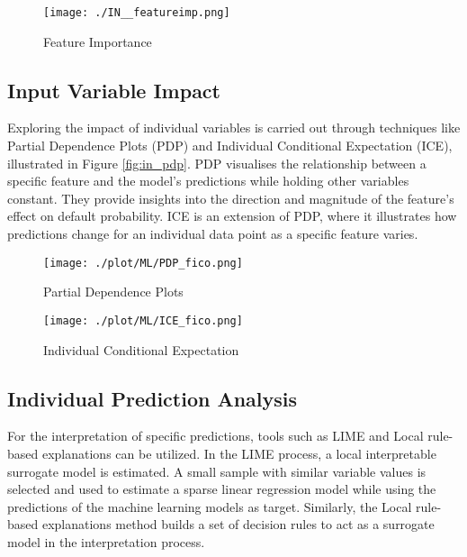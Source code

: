 \begin{figure}[H]
	\centering
	\texttt{[image: ./IN\_\_featureimp.png]}
    \caption{Feature Importance}
    \label{fig:in_featureimp}
\end{figure}

\subsection{Input Variable Impact}
Exploring the impact of individual variables is carried out through techniques like Partial Dependence Plots (PDP) and Individual Conditional Expectation (ICE), illustrated in Figure \ref{fig:in_pdp}. PDP visualises the relationship between a specific feature and the model's predictions while holding other variables constant. They provide insights into the direction and magnitude of the feature's effect on default probability. ICE is an extension of PDP, where it illustrates how predictions change for an individual data point as a specific feature varies. \cite[p.~63]{Roberts2022}

\begin{figure}[H]
\begin{minipage}{.5\textwidth}
	\centering
	\texttt{[image: ./plot/ML/PDP\_fico.png]}
    \caption{Partial Dependence Plots}
    \label{fig:in_pdp}
\end{minipage}%
\begin{minipage}{.5\textwidth}
	\centering
	\texttt{[image: ./plot/ML/ICE\_fico.png]}
    \caption{Individual Conditional Expectation}
    \label{fig:in_ice}
\end{minipage}
\end{figure}

\subsection{Individual Prediction Analysis}
For the interpretation of specific predictions, tools such as \ac{LIME} and Local rule-based explanations can be utilized. In the \ac{LIME} process, a local interpretable surrogate model is estimated. A small sample with similar variable values is selected and used to estimate a sparse linear regression model while using the predictions of the machine learning models as target. Similarly, the Local rule-based explanations method builds a set of decision rules to act as a surrogate model in the interpretation process. \cite[p.~65-67]{Roberts2022}

